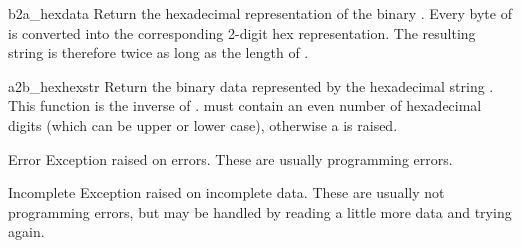 \begin{funcdesc}{b2a_hex}{data}
Return the hexadecimal representation of the binary .  Every
byte of  is converted into the corresponding 2-digit hex
representation.  The resulting string is therefore twice as long as
the length of .
\end{funcdesc}

\begin{funcdesc}{a2b_hex}{hexstr}
Return the binary data represented by the hexadecimal string
.  This function is the inverse of .
 must contain an even number of hexadecimal digits (which
can be upper or lower case), otherwise a  is
raised.
\end{funcdesc}

\begin{excdesc}{Error}
Exception raised on errors. These are usually programming errors.
\end{excdesc}

\begin{excdesc}{Incomplete}
Exception raised on incomplete data. These are usually not programming
errors, but may be handled by reading a little more data and trying
again.
\end{excdesc}


\begin{seealso}



\end{seealso}

